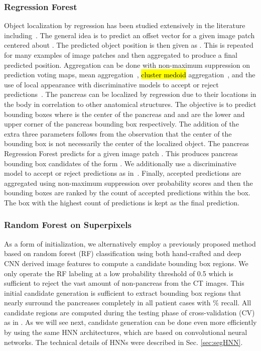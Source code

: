 \documentclass[journal]{IEEEtran}
\begin{document}
\subsubsection{Regression Forest}\label{sec:regression}
Object localization by regression has been studied extensively in the literature including~\cite{criminisi2013regression,regressionKidneys,laybirkbeck2013}. The general idea is to predict an offset vector  for a given image patch  centered about . The predicted object position is then given as . This is repeated for many examples of image patches and then aggregated to produce a final predicted position. Aggregation can be done with non-maximum suppression on prediction voting maps, mean aggregation~\cite{criminisi2013regression}, \hl{cluster medoid} aggregation~\cite{regressionKidneys}, and the use of local appearance with discriminative models to accept or reject predictions~\cite{laybirkbeck2013}.
The pancreas can be localized by regression due to their locations in the body in correlation to other anatomical structures. The objective is to predict bounding boxes  where  is the center of the pancreas and  and  are the lower and upper corner of the pancreas bounding box respectively. The addition of the extra three parameters follows from the observation that the center of the bounding box is not necessarily the center of the localized object. The pancreas Regression Forest predicts  for a given image patch . This produces pancreas bounding box candidates of the form . We additionally use a discriminative model to accept or reject predictions  as in~\cite{laybirkbeck2013}. Finally, accepted predictions are aggregated using non-maximum suppression over probability scores and then the bounding boxes are ranked by the count of accepted predictions within the box. The box with the highest count of predictions is kept as the final prediction. \subsubsection{Random Forest on Superpixels}
\label{sec:region_candidates_RF}
As a form of initialization, we alternatively employ a previously proposed method based on random forest (RF) classification \cite{farag2014bottom,roth2015deeporgan} using both hand-crafted and deep CNN derived image features to compute a candidate bounding box regions. We only operate the RF labeling at a low probability threshold of 0.5 which is sufficient to reject the vast amount of non-pancreas from the CT images. This initial candidate generation is sufficient to extract bounding box regions that nearly surround the pancreases completely in all patient cases with \% recall. All candidate regions are computed during the testing phase of cross-validation (CV) as in \cite{roth2015deeporgan}.   
As we will see next, candidate generation can be done even more efficiently by using the same HNN architectures, which are based on convolutional neural networks. The technical details of HNNs were described in Sec. \ref{sec:segHNN}. 
\end{document}
